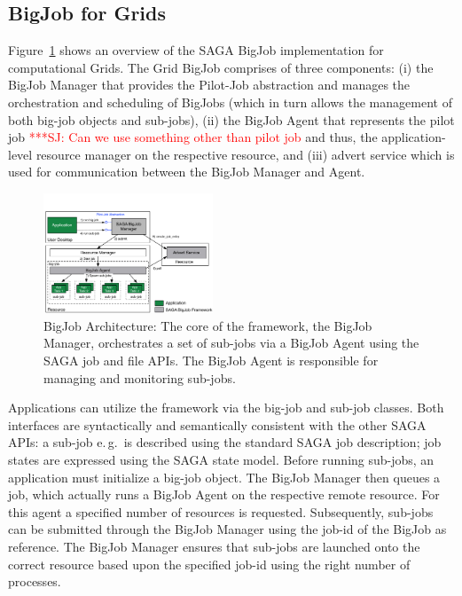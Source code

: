 \documentclass[conference,final]{IEEEtran}
\newcommand{\up}{\vspace*{-1em}}
\newcommand{\alnote}[1]{ {\textcolor{blue} { ***AL: #1 }}}
\newcommand{\jhanote}[1]{ {\textcolor{red} { ***SJ: #1 }}}
\newcommand{\alnote}[1]{}
\newcommand{\jhanote}[1]{}
\begin{document}


\subsection{BigJob for Grids}
\up

Figure~\ref{fig:figures_bigjob} shows an overview of the SAGA BigJob
implementation for computational Grids. The Grid BigJob comprises of
three components: (i) the BigJob Manager that provides the Pilot-Job
abstraction and manages the orchestration and scheduling of BigJobs
(which in turn allows the management of both big-job objects and
sub-jobs), (ii) the BigJob Agent that represents the pilot job
\jhanote{Can we use something other than pilot job} and thus, the
application-level resource manager on the respective resource, and
(iii) advert service which is used for communication between the
BigJob Manager and Agent.


\begin{figure}[ht]
    \centering
    \includegraphics[width=0.45\textwidth]{figures/bigjob}
   \caption{BigJob Architecture: The core of the framework, the
      BigJob Manager, orchestrates a set of sub-jobs via a
      BigJob Agent using the SAGA job and file APIs.  The
      BigJob Agent is responsible for managing and monitoring sub-jobs.\up}
   \label{fig:figures_bigjob}
\end{figure}

Applications can utilize the framework via the big-job and sub-job
classes. Both interfaces are syntactically and semantically consistent
with the other SAGA APIs: a sub-job e.\,g.\ is described using 
the standard SAGA job description; job states are expressed
using the SAGA state model. Before running sub-jobs, an application must initialize
a big-job object. The BigJob Manager then queues a job,
which actually runs a BigJob Agent on the respective remote
resource. For this agent a specified number of resources is
requested. Subsequently, sub-jobs can be submitted through the BigJob
Manager using the job-id of the BigJob as reference. The BigJob
Manager ensures that sub-jobs are launched onto the correct
resource based upon the specified job-id using the right number of
processes. 
\end{document}
